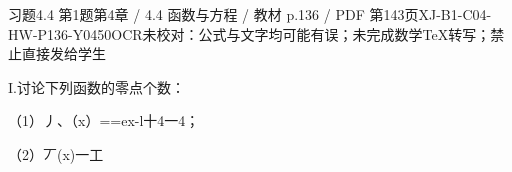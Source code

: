 \begin{bankitem}{习题4.4 第1题}{第4章 / 4.4 函数与方程 / 教材 p.136 / PDF 第143页}{XJ-B1-C04-HW-P136-Y0450}{OCR未校对：公式与文字均可能有误；未完成数学TeX转写；禁止直接发给学生}
\begin{ocrdraft}
\par
I.讨论下列函数的零点个数：
\par
（1）丿、（x）==ex-l十4一4；
\par
（2）丆(x)一工
\end{ocrdraft}
\end{bankitem}

